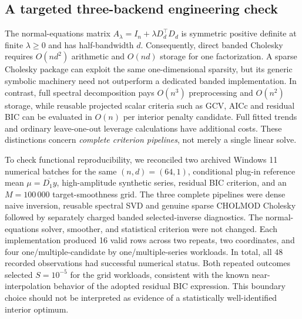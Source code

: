 \subsection{A targeted three-backend engineering check}
\label{sec:three-backend-check}
The normal-equations matrix
$A_\lambda=I_n+\lambda D_d^\top D_d$ is symmetric positive
definite at finite $\lambda\geq0$ and has half-bandwidth $d$.
Consequently, direct banded Cholesky requires
$O(nd^2)$ arithmetic and $O(nd)$ storage for one factorization.
A sparse Cholesky package can exploit the same one-dimensional
sparsity, but its generic symbolic machinery need not outperform
a dedicated banded implementation. In contrast, full spectral
decomposition pays $O(n^3)$ preprocessing and $O(n^2)$ storage,
while reusable projected scalar criteria such as GCV, AICc
and residual BIC can be evaluated in $O(n)$ per interior
penalty candidate. Full fitted trends and ordinary
leave-one-out leverage calculations have additional costs.
These distinctions concern \emph{complete criterion pipelines},
not merely a single linear solve.

To check functional reproducibility, we reconciled two archived
Windows 11 numerical batches for the same
$(n,d)=(64,1)$, conditional plug-in reference mean
$\mu=\overline{D_1y}$, high-amplitude synthetic series,
residual BIC criterion, and an $M=100\,000$ target-smoothness
grid. The three complete pipelines were dense naive inversion,
reusable spectral SVD and genuine sparse CHOLMOD Cholesky followed
by separately charged banded selected-inverse diagnostics.
The normal-equations solver, smoother, and statistical
criterion were not changed. Each implementation produced
16 valid rows across two repeats, two coordinates, and four
one/multiple-candidate by one/multiple-series workloads.
In total, all 48 recorded observations had successful
numerical status. Both repeated outcomes selected $S=10^{-5}$
for the grid workloads, consistent with the known
near-interpolation behavior of the adopted residual BIC
expression. This boundary choice should not be interpreted
as evidence of a statistically well-identified interior optimum.

